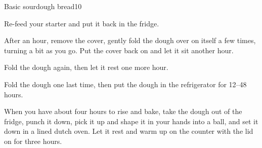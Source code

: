 \documentclass{article}
\begin{document}
\begin{recipe}{Basic sourdough bread}{10}
\begin{step}
    \end{step}
    \begin{step}
      \begin{ingrs}
      \end{ingrs}
      \begin{stepdesc}
        Re-feed your starter and put it back in the fridge.
      \end{stepdesc}
    \end{step}
    \begin{step}
      \begin{ingrs}
      \end{ingrs}
      \begin{stepdesc}
        After an hour, remove the cover, gently fold the dough over on itself a few times, turning a bit as you go. Put the cover back on and let it sit another hour.
      \end{stepdesc}
    \end{step}
    \begin{step}
      \begin{ingrs}
      \end{ingrs}
      \begin{stepdesc}
        Fold the dough again, then let it rest one more hour.
      \end{stepdesc}
    \end{step}
    \begin{step}
      \begin{ingrs}
      \end{ingrs}
      \begin{stepdesc}
        Fold the dough one last time, then put the dough in the refrigerator for 12--48 hours.
      \end{stepdesc}
    \end{step}
    \begin{step}
      \begin{ingrs}
      \end{ingrs}
      \begin{stepdesc}
        When you have about four hours to rise and bake, take the dough out of the fridge, punch it down, pick it up and shape it in your hands into a ball, and set it down in a lined dutch oven. Let it rest and warm up on the counter with the lid on for three hours.
      \end{stepdesc}
    \end{step}

\end{recipe}
\end{document}
